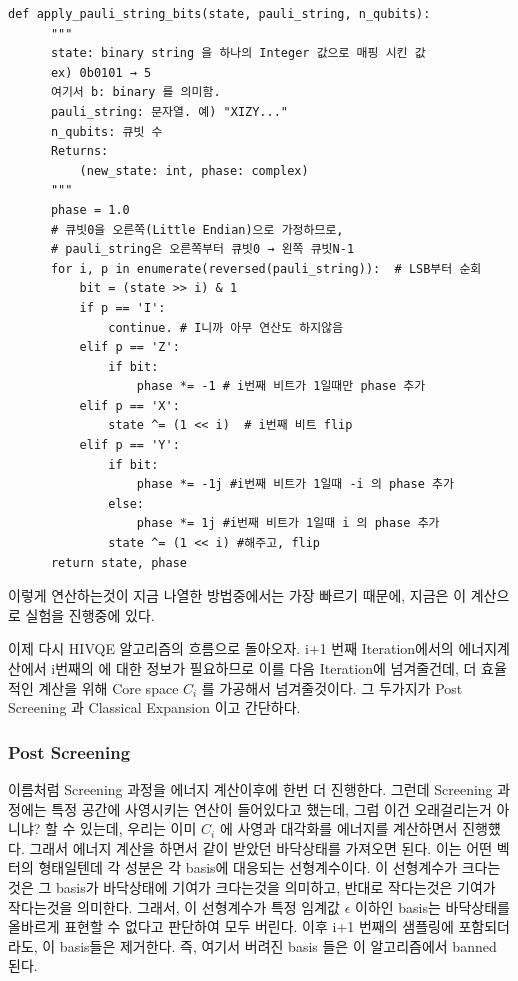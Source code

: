 \documentclass[11pt]{article}
\begin{document}
\begin{enumerate}
  \begin{lstlisting}[style=pythonstyle, caption={apply\_pauli\_string\_bits 함수}]
  def apply_pauli_string_bits(state, pauli_string, n_qubits):
      """
      state: binary string 을 하나의 Integer 값으로 매핑 시킨 값 
      ex) 0b0101 → 5
      여기서 b: binary 를 의미함. 
      pauli_string: 문자열. 예) "XIZY..."
      n_qubits: 큐빗 수
      Returns:
          (new_state: int, phase: complex)
      """
      phase = 1.0
      # 큐빗0을 오른쪽(Little Endian)으로 가정하므로,
      # pauli_string은 오른쪽부터 큐빗0 → 왼쪽 큐빗N-1
      for i, p in enumerate(reversed(pauli_string)):  # LSB부터 순회
          bit = (state >> i) & 1
          if p == 'I': 
              continue. # I니까 아무 연산도 하지않음
          elif p == 'Z':
              if bit:
                  phase *= -1 # i번째 비트가 1일때만 phase 추가
          elif p == 'X':
              state ^= (1 << i)  # i번째 비트 flip
          elif p == 'Y':
              if bit:
                  phase *= -1j #i번째 비트가 1일때 -i 의 phase 추가 
              else:
                  phase *= 1j #i번째 비트가 1일때 i 의 phase 추가 
              state ^= (1 << i) #해주고, flip
      return state, phase
  \end{lstlisting}
  이렇게 연산하는것이 지금 나열한 방법중에서는 가장 빠르기 때문에, 지금은 이 계산으로 실험을 진행중에 있다. 
\end{enumerate}

이제 다시 HIVQE 알고리즘의 흐름으로 돌아오자. i+1 번째 Iteration에서의 에너지계산에서 i번째의 에 대한 정보가 필요하므로 이를 다음 Iteration에 넘겨줄건데, 
더 효율적인 계산을 위해 Core space \(C_i\) 를 가공해서 넘겨줄것이다. 그 두가지가 Post Screening 과 Classical Expansion 이고 간단하다. 
\subsubsection{Post Screening}
이름처럼 Screening 과정을 에너지 계산이후에 한번 더 진행한다. 그런데 Screening 과정에는 특정 공간에 사영시키는 연산이 들어있다고 했는데, 그럼 이건 오래걸리는거 아니냐? 할 수 있는데, 
우리는 이미 \(C_i\) 에 사영과 대각화를 에너지를 계산하면서 진행헀다. 그래서 에너지 계산을 하면서 같이 받았던 바닥상태를 가져오면 된다. 
이는 어떤 벡터의 형태일텐데 각 성분은 각 basis에 대응되는 선형계수이다. 이 선형계수가 크다는것은 그 basis가 바닥상태에 기여가 크다는것을 의미하고, 반대로 작다는것은 기여가 작다는것을 의미한다. 
그래서, 이 선형계수가 특정 임계값 \(\epsilon\) 이하인 basis는 바닥상태를 올바르게 표현할 수 없다고 판단하여 모두 버린다. 이후 i+1 번째의 샘플링에 포함되더라도, 이 basis들은 제거한다.
즉, 여기서 버려진 basis 들은 이 알고리즘에서 banned 된다. 
\end{document}
